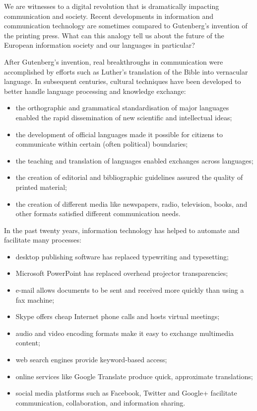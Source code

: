 \begin{multicols}{2}
We are witnesses to a digital revolution that is dramatically impacting communication and society. Recent developments in information and communication technology are sometimes compared to Gutenberg’s invention of the printing press. What can this analogy tell us about the future of the European information society and our languages in particular?


After Gutenberg’s invention, real breakthroughs in communication were accomplished by efforts such as Luther’s translation of the Bible into vernacular language. In subsequent centuries, cultural techniques have been developed to better handle language processing and knowledge exchange:

\begin{itemize}
\item the orthographic and grammatical standardisation of major languages enabled the rapid dissemination of new scientific and intellectual ideas;
\item the development of official languages made it possible for citizens to communicate within certain (often political) boundaries;
\item the teaching and translation of languages enabled exchanges across languages;
\item the creation of editorial and bibliographic guidelines assured the quality of printed material;
\item the creation of different media like newspapers, radio, television, books, and other formats satisfied different communication needs. 
\end{itemize}

In the past twenty years, information technology has helped to automate and facilitate many processes:

\begin{itemize}
\item desktop publishing software has replaced typewriting and typesetting;
\item Microsoft PowerPoint has replaced overhead projector transparencies;
\item e-mail allows documents to be sent and received more quickly than using a fax machine;
\item Skype offers cheap Internet phone calls and hosts virtual meetings;
\item audio and video encoding formats make it easy to exchange multimedia content;
\item web search engines provide keyword-based access;
\item online services like Google Translate produce quick, approximate translations;
\item social media platforms such as Facebook, Twitter and Google+ facilitate communication, collaboration, and information sharing.
\end{itemize}


\end{multicols}
